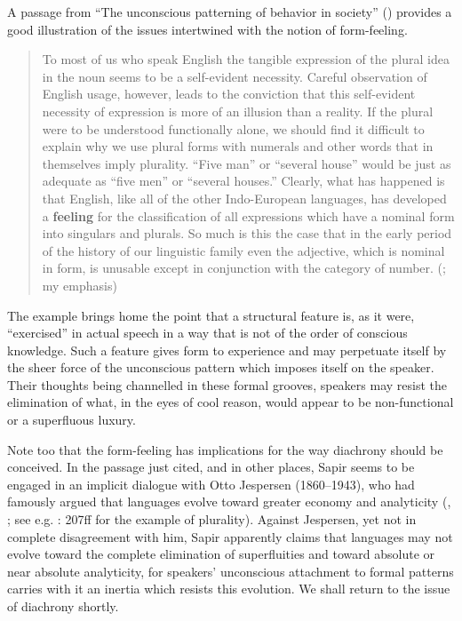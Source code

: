 \documentclass[output=paper]{langscibook}
\begin{document}
A passage from ``The unconscious patterning of behavior in society'' (\citeyear{Sapir1927b}) provides a good illustration of the issues intertwined with the notion of form-feeling.

\begin{quotation}
To most of us who speak English the tangible expression of the plural idea in the noun seems to be a self-evident necessity. Careful observation of English usage, however, leads to the conviction that this self-evident necessity of expression is more of an illusion than a reality. If the plural were to be understood functionally alone, we should find it difficult to explain why we use plural forms with numerals and other words that in themselves imply plurality. ``Five man'' or ``several house'' would be just as adequate as ``five men'' or ``several houses.'' Clearly, what has happened is that English, like all of the other Indo-European languages, has developed a \textbf{feeling} for the classification of all expressions which have a nominal form into singulars and plurals. So much is this the case that in the early period of the history of our linguistic family even the adjective, which is nominal in form, is unusable except in conjunction with the category of number. (\citealt[550]{Sapir1927b}; my emphasis)
\end{quotation}

The example brings home the point that a structural feature is, as it were, ``exercised'' in actual speech in a way that is not of the order of conscious knowledge. Such a feature gives form to experience and may perpetuate itself by the sheer force of the unconscious pattern which imposes itself on the speaker. Their thoughts being channelled in these formal grooves, speakers may resist the elimination of what, in the eyes of cool reason, would appear to be non-functional or a superfluous luxury.

Note too that the form-feeling has implications for the way diachrony should be conceived. In the passage just cited, and in other places, Sapir seems to be engaged in an implicit dialogue with Otto Jespersen (1860--1943), who had famously argued that languages evolve toward greater economy and analyticity (\citeyear{Jespersen1894}, \citeyear{Jespersen1965}; see e.g. \citeyear{Jespersen1965}: 207ff for the example of plurality). Against Jespersen, yet not in complete disagreement with him, Sapir apparently claims that languages may not evolve toward the complete elimination of superfluities and toward absolute or near absolute analyticity, for speakers' unconscious attachment to formal patterns carries with it an inertia which resists this evolution. We shall return to the issue of diachrony shortly.
\end{document}
